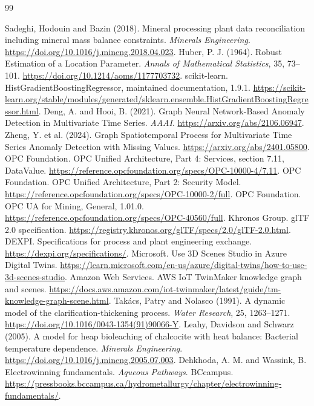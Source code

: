 \begin{thebibliography}{99}
\small\raggedright
{} Sadeghi, Hodouin and Bazin (2018). Mineral processing plant data reconciliation including mineral mass balance constraints. \emph{Minerals Engineering}. \url{https://doi.org/10.1016/j.mineng.2018.04.023}.
 Huber, P. J. (1964). Robust Estimation of a Location Parameter. \emph{Annals of Mathematical Statistics}, 35, 73--101. \url{https://doi.org/10.1214/aoms/1177703732}.
 scikit-learn. HistGradientBoostingRegressor, maintained documentation, 1.9.1. \url{https://scikit-learn.org/stable/modules/generated/sklearn.ensemble.HistGradientBoostingRegressor.html}.
 Deng, A. and Hooi, B. (2021). Graph Neural Network-Based Anomaly Detection in Multivariate Time Series. \emph{AAAI}. \url{https://arxiv.org/abs/2106.06947}.
 Zheng, Y. et al. (2024). Graph Spatiotemporal Process for Multivariate Time Series Anomaly Detection with Missing Values. \url{https://arxiv.org/abs/2401.05800}.
 OPC Foundation. OPC Unified Architecture, Part 4: Services, section 7.11, DataValue. \url{https://reference.opcfoundation.org/specs/OPC-10000-4/7.11}.
 OPC Foundation. OPC Unified Architecture, Part 2: Security Model. \url{https://reference.opcfoundation.org/specs/OPC-10000-2/full}.
 OPC Foundation. OPC UA for Mining, General, 1.01.0. \url{https://reference.opcfoundation.org/specs/OPC-40560/full}.
 Khronos Group. glTF 2.0 specification. \url{https://registry.khronos.org/glTF/specs/2.0/glTF-2.0.html}.
 DEXPI. Specifications for process and plant engineering exchange. \url{https://dexpi.org/specifications/}.
 Microsoft. Use 3D Scenes Studio in Azure Digital Twins. \url{https://learn.microsoft.com/en-us/azure/digital-twins/how-to-use-3d-scenes-studio}.
 Amazon Web Services. AWS IoT TwinMaker knowledge graph and scenes. \url{https://docs.aws.amazon.com/iot-twinmaker/latest/guide/tm-knowledge-graph-scene.html}.
 Takács, Patry and Nolasco (1991). A dynamic model of the clarification-thickening process. \emph{Water Research}, 25, 1263--1271. \url{https://doi.org/10.1016/0043-1354(91)90066-Y}.
 Leahy, Davidson and Schwarz (2005). A model for heap bioleaching of chalcocite with heat balance: Bacterial temperature dependence. \emph{Minerals Engineering}. \url{https://doi.org/10.1016/j.mineng.2005.07.003}.
 Dehkhoda, A. M. and Wassink, B. Electrowinning fundamentals. \emph{Aqueous Pathways}. BCcampus. \url{https://pressbooks.bccampus.ca/hydrometallurgy/chapter/electrowinning-fundamentals/}.

\end{thebibliography}
